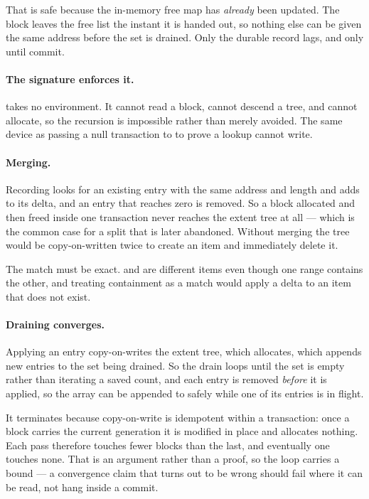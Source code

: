 That is safe because the in-memory free map has \emph{already} been updated.
The block leaves the free list the instant it is handed out, so nothing else
can be given the same address before the set is drained. Only the durable
record lags, and only until commit.

\paragraph{The signature enforces it.}  takes
no environment. It cannot read a block, cannot descend a tree, and cannot
allocate, so the recursion is impossible rather than merely avoided. The same
device as passing a null transaction to  to prove a
lookup cannot write.

\paragraph{Merging.} Recording looks for an existing entry with the same
address and length and adds to its delta, and an entry that reaches zero is
removed. So a block allocated and then freed inside one transaction never
reaches the extent tree at all --- which is the common case for a split that is
later abandoned. Without merging the tree would be copy-on-written twice to
create an item and immediately delete it.

The match must be exact. \code{[0x1000, 0x2000)} and \code{[0x0, 0x11000)} are
different items even though one range contains the other, and treating
containment as a match would apply a delta to an item that does not exist.

\paragraph{Draining converges.} Applying an entry copy-on-writes the extent
tree, which allocates, which appends new entries to the set being drained. So
the drain loops until the set is empty rather than iterating a saved count, and
each entry is removed \emph{before} it is applied, so the array can be appended
to safely while one of its entries is in flight.

It terminates because copy-on-write is idempotent within a transaction: once a
block carries the current generation it is modified in place and allocates
nothing. Each pass therefore touches fewer blocks than the last, and eventually
one touches none. That is an argument rather than a proof, so the loop carries
a bound --- a convergence claim that turns out to be wrong should fail where it
can be read, not hang inside a commit.


